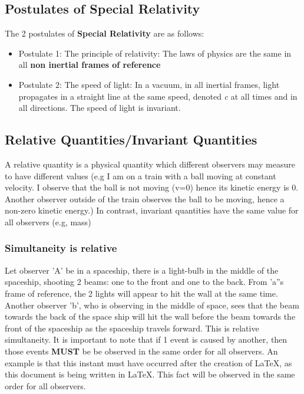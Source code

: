 \documentclass[10pt]{report}
\begin{document}
\subsection{Postulates of \textbf{Special Relativity}}
\par{The 2 postulates of \textbf{Special Relativity} are as follows:
\begin{itemize}
	\item{Postulate 1: The principle of relativity: The laws of physics are the same in all \textbf{non inertial frames of reference}}
	\item{Postulate 2: The speed of light: In a vacuum, in all inertial frames, light propagates in a straight line at the same speed, denoted \textit{c} at all times and in all directions. The speed of light is invariant.}
\end{itemize}
\subsection{Relative Quantities/Invariant Quantities}
\par{A relative quantity is a physical quantity which different observers may measure to have different values (e.g I am on a train with a ball moving at constant velocity. I observe that the ball is not moving (v=0) hence its kinetic energy is 0. Another observer outside of the train observes the ball to be moving, hence a non-zero kinetic energy.) In contrast, invariant quantities have the same value for all observers (e.g, mass)}
\subsubsection{Simultaneity is relative}
\par{Let observer 'A' be in a spaceship, there is a light-bulb in the middle of the spaceship, shooting 2 beams: one to the front and one to the back. From 'a''s frame of reference, the 2 lights will appear to hit the wall at the same time. Another observer 'b', who is observing in the middle of space, sees that the beam towards the back of the space ship will hit the wall before the beam towards the front of the spaceship as the spaceship travels forward. This is relative simultaneity. It is important to note that if 1 event is caused by another, then those events \textbf{MUST} be be observed in the same order for all observers. An example is that this instant must have occurred after the creation of \LaTeX, as this document is being written in \LaTeX. This fact will be observed in the same order for all observers.}
}
\end{document}
